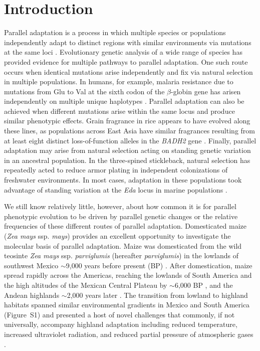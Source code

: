 \section*{Introduction}
\noindent Parallel adaptation is a process in which multiple species or populations independently adapt to distinct regions with similar environments via mutations at the same loci \cite[]{Wood_2005_15881688,Arendt_2008_18022278,Elmer_2011_21459472}.
Evolutionary genetic analysis of a wide range of species has provided evidence for multiple pathways to parallel adaptation. One such route occurs when identical mutations arise independently and fix via natural selection in multiple populations. In humans, for example, malaria resistance due to mutations from Glu to Val at the sixth codon of the $\beta$-globin gene has arisen independently on multiple unique haplotypes  \cite[]{Currat_2002_11741197,Kwiatkowski_2005_16001361}.  Parallel adaptation can also be achieved when different mutations arise within the same locus and produce similar phenotypic effects.  Grain fragrance in rice appears to have evolved along these lines, as populations across East Asia have similar fragrances resulting from at least eight distinct loss-of-function alleles in the  \emph{BADH2} gene \cite[]{Kovach_2009_19706531}.  Finally, parallel adaptation may arise from natural selection acting on standing genetic variation in an ancestral population.  In the three-spined stickleback, natural selection has repeatedly acted to reduce armor plating in independent colonizations of freshwater environments.  In most cases, adaptation in these populations took advantage of standing variation at the \emph{Eda} locus in marine populations \cite[]{Colosimo_2005_15790847}.  

We still know relatively little, however, about how common it is for parallel phenotypic evolution to be driven by parallel genetic changes 
or the relative frequencies of these different routes of parallel adaptation.
Domesticated maize (\emph{Zea mays} ssp. \emph{mays}) provides an excellent opportunity to investigate the molecular basis of parallel adaptation.  Maize was domesticated from the wild teosinte \emph{Zea mays} ssp. \emph{parviglumis} (hereafter \emph{parviglumis}) in the lowlands of southwest Mexico $\sim$9,000 years before present (BP) \cite[]{Matsuoka_2002_11983901,Piperno_2009_19307570,vanHeerwaarden_2011_21189301}. After domestication, maize spread rapidly across the Americas, reaching the lowlands of South America and the high altitudes of the Mexican Central Plateau by $\sim$6,000 BP \cite[]{Piperno_2006_69}, and the Andean highlands $\sim$2,000 years later \cite[]{Perry_2006_16511492,Grobman_2012_22307642}. 
The transition from lowland to highland habitats spanned similar environmental gradients in Mexico and South America (Figure~S1) and presented a host of novel challenges that commonly, if not universally, accompany highland adaptation including reduced temperature, increased ultraviolet radiation, and reduced partial pressure of atmospheric gases \cite[]{Korner_2007_17988759}.

